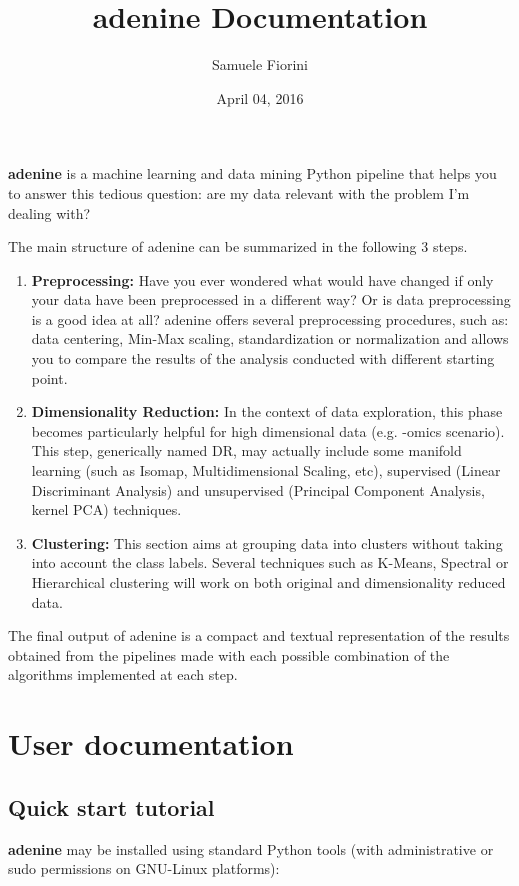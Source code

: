 \documentclass[letterpaper,10pt,english]{sphinxmanual}
\title{adenine Documentation}
\date{April 04, 2016}
\author{Samuele Fiorini}
\begin{document}
\maketitle
\tableofcontents
{}\label{index::doc}


\textbf{adenine} is a machine learning and data mining Python pipeline that helps you to answer this tedious question: are my data relevant with the problem I'm dealing with?

The main structure of adenine can be summarized in the following 3 steps.
\begin{enumerate}
\item {} 
\textbf{Preprocessing:} Have you ever wondered what would have changed if only  your data have been preprocessed in a different way? Or is data preprocessing is a good idea at all? adenine offers several preprocessing procedures, such as: data centering, Min-Max scaling, standardization or normalization and allows you to compare the results of the analysis conducted with different starting point.

\item {} 
\textbf{Dimensionality Reduction:} In the context of data exploration, this  phase becomes particularly helpful for high dimensional data (e.g. -omics scenario). This step, generically named DR, may actually include some manifold learning   (such as Isomap, Multidimensional Scaling, etc), supervised (Linear   Discriminant Analysis) and unsupervised (Principal Component Analysis, kernel PCA) techniques.

\item {} 
\textbf{Clustering:} This section aims at grouping data into clusters without taking into account the class labels. Several techniques such as K-Means, Spectral or Hierarchical clustering will work on both original and dimensionality reduced data.

\end{enumerate}

The final output of adenine is a compact and textual representation of the results obtained from the pipelines made with each possible combination of the algorithms
implemented at each step.


\chapter{User documentation}
\label{index:adenine-a-data-exploration-pipeline}\label{index:user-documentation}

\section{Quick start tutorial}
\label{tutorial::doc}\label{tutorial:quick-start-tutorial}\label{tutorial:tutorial}
\textbf{adenine} may be installed using standard Python tools (with
administrative or sudo permissions on GNU-Linux platforms):
\end{document}
